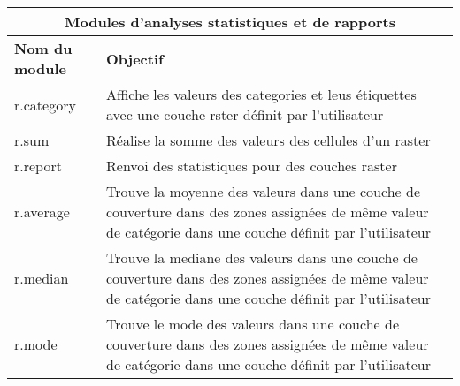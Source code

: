 \begin{table}[H]
\centering
 \begin{tabular}{|p{4cm}|p{10cm}|}
   \hline \multicolumn{2}{|c|}{\textbf{Modules d'analyses statistiques et de rapports}} \\
  \hline \textbf{Nom du module} & \textbf{Objectif} \\
  \hline r.category & Affiche les valeurs des categories et leus étiquettes avec une couche rster définit par l'utilisateur \\
  \hline r.sum & Réalise la somme des valeurs des cellules d'un raster \\
  \hline r.report & Renvoi des statistiques pour des couches raster \\
  \hline r.average & Trouve la moyenne des valeurs dans une couche de couverture dans des zones assignées de m\^eme valeur de catégorie dans une couche définit par l'utilisateur \\
  \hline r.median & Trouve la mediane des valeurs dans une couche de couverture dans des zones assignées de m\^eme valeur de catégorie dans une couche définit par l'utilisateur \\
  \hline r.mode & Trouve le mode des valeurs dans une couche de couverture dans des zones assignées de m\^eme valeur de catégorie  dans une couche définit par l'utilisateur \\

\end{tabular}
\end{table}
